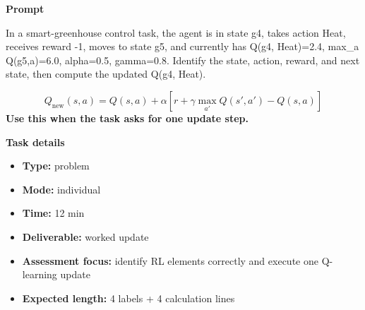 \documentclass[11pt]{article}
\begin{document}
\begin{tcolorbox}[colback=white,colframe=MidnightBlue,title={Q3 Structured Problem},fonttitle=\bfseries,breakable]
\begin{center}
\end{center}

{\large\bfseries\color{MidnightBlue} Prompt}\par\medskip
In a smart-greenhouse control task, the agent is in state g4, takes action Heat, receives reward -1, moves to state g5, and currently has Q(g4, Heat)=2.4, max\_a Q(g5,a)=6.0, alpha=0.5, gamma=0.8. Identify the state, action, reward, and next state, then compute the updated Q(g4, Heat).

\begin{tcolorbox}[colback=ForestGreen!5,colframe=ForestGreen,title={Formula reminder},fonttitle=\bfseries,breakable]
\[
Q_{\text{new}}(s,a)=Q(s,a)+\alpha\left[r+\gamma \max_{a'}Q(s',a')-Q(s,a)\right]
\]
\textbf{Use this when the task asks for one update step.}
\end{tcolorbox}

{\large\bfseries\color{MidnightBlue} Task details}\par\medskip
\begin{itemize}\item \textbf{Type:} problem
\item \textbf{Mode:} individual
\item \textbf{Time:} 12 min
\item \textbf{Deliverable:} worked update
\item \textbf{Assessment focus:} identify RL elements correctly and execute one Q-learning update
\item \textbf{Expected length:} 4 labels + 4 calculation lines\end{itemize}


\end{tcolorbox}
\end{document}
